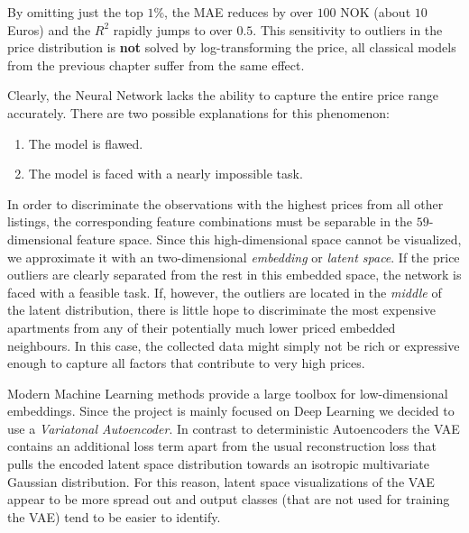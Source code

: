 \documentclass[12pt, letterpaper]{article}
\begin{document}
By omitting just the top $1$\%, the MAE reduces by over $100$ NOK (about $10$ Euros) and the $R^2$ rapidly jumps to over $0.5$.
This sensitivity to outliers in the price distribution is \textbf{not} solved by log-transforming the price, all classical models from the previous chapter suffer from the same effect.

Clearly, the Neural Network lacks the ability to capture the entire price range accurately.
There are two possible explanations for this phenomenon:
\begin{enumerate}
    \item The model is flawed.
    \item The model is faced with a nearly impossible task.
\end{enumerate}
In order to discriminate the observations with the highest prices from all other listings, the corresponding feature combinations must be separable in the $59$-dimensional feature space.
Since this high-dimensional space cannot be visualized, we approximate it with an two-dimensional \emph{embedding} or \emph{latent space}.
If the price outliers are clearly separated from the rest in this embedded space, the network is faced with a feasible task.
If, however, the outliers are located in the \emph{middle} of the latent distribution, there is little hope to discriminate the most expensive apartments from any of their potentially much lower priced embedded neighbours.
In this case, the collected data might simply not be rich or expressive enough to capture all factors that contribute to very high prices.

Modern Machine Learning methods provide a large toolbox for low-dimensional embeddings.
Since the project is mainly focused on Deep Learning we decided to use a \emph{Variatonal Autoencoder}.
In contrast to deterministic Autoencoders the VAE contains an additional loss term apart from the usual reconstruction loss that pulls the encoded latent space distribution towards an isotropic multivariate Gaussian distribution.
For this reason, latent space visualizations of the VAE appear to be more spread out and output classes (that are not used for training the VAE) tend to be easier to identify.
\end{document}
